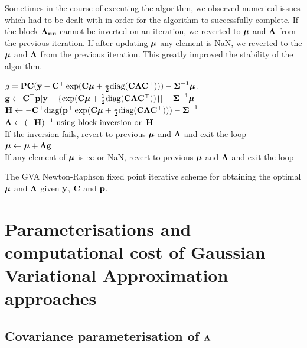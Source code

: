 Sometimes in the course of  executing the algorithm, we observed numerical issues which had to be dealt
with in order for the algorithm to successfully complete. If the block ${\boldsymbol \Lambda}_{{\bf u} {\bf u}}$ cannot be inverted on an
iteration, we reverted to ${\boldsymbol \mu}$ and ${\boldsymbol \Lambda}$ from the previous iteration. If after updating ${\boldsymbol \mu}$
any element is NaN, we reverted to the ${\boldsymbol \mu}$ and ${\boldsymbol \Lambda}$ from the previous iteration. This greatly
improved the stability of the algorithm.

\begin{algorithm}
	\begin{algorithmic}
		\REQUIRE $g = {\bf P} {\bf C} ({\bf y} - {\bf C}^\top \exp({\bf C} {\boldsymbol \mu} + \tfrac{1}{2} \text{diag}{({\bf C}{\boldsymbol\Lambda}{\bf C}^\top)})) - {\boldsymbol \Sigma}^{-1} {\boldsymbol \mu}$.
			\STATE ${\bf g} \leftarrow {\bf C}^\top {\bf p} [{\bf y} - \{ \exp({\bf C} {\boldsymbol \mu} + \tfrac{1}{2} \text{diag}({\bf C} {\boldsymbol \Lambda} {\bf C}^\top)) \}] - {\boldsymbol \Sigma}^{-1} {\boldsymbol \mu}$ \\
			\STATE ${\bf H} \leftarrow -{\bf C}^\top \text{diag}({\bf p}^\top \exp({\bf C} {\boldsymbol \mu} + \tfrac{1}{2} \text{diag}({\bf C} {\boldsymbol \Lambda} {\bf C}^\top))) - {\boldsymbol \Sigma}^{-1}$ \\
			\STATE ${\boldsymbol \Lambda} \leftarrow (-{\bf H})^{-1} \text{ using block inversion on } {\bf H}$ \\
			If the inversion fails, revert to previous ${\boldsymbol \mu}$ and ${\boldsymbol \Lambda}$ and exit the loop \\
			\STATE ${\boldsymbol \mu} \leftarrow {\boldsymbol\mu} + {\boldsymbol \Lambda} {\bf g}$ \\
			If any element of ${\boldsymbol \mu}$ is $\infty$ or NaN, revert to previous ${\boldsymbol \mu}$ and ${\boldsymbol \Lambda}$ and exit the loop
		\ENDWHILE
	\end{algorithmic}
	\caption{The GVA Newton-Raphson fixed point iterative scheme for obtaining the optimal ${\boldsymbol \mu}$ and ${\boldsymbol \Lambda}$
		given ${\bf y}$, ${\bf C}$ and ${\bf p}$.}
	\label{alg:algorithm_nr}
\end{algorithm}
		
		
\section{Parameterisations and computational cost of Gaussian Variational Approximation approaches}
\label{sec:param}
\subsection{Covariance parameterisation of ${\boldsymbol \Lambda}$}

